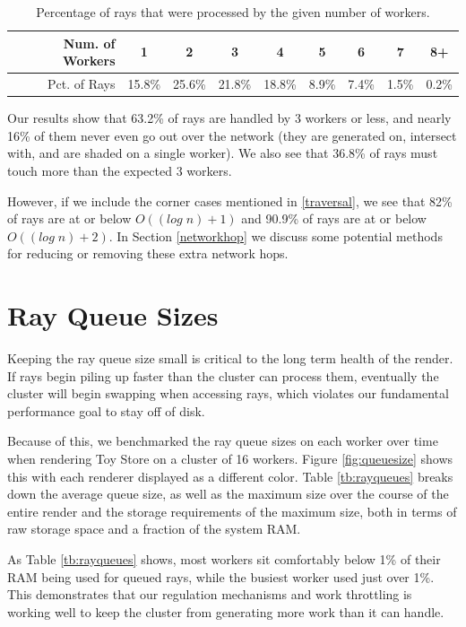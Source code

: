 \documentclass[12pt]{ucthesis}
\begin{document}
\begin{table}
\begin{center}
\begin{tabular}{|r||c|c|c|c|c|c|c|c|}
    \hline
    Num. of Workers& 1 & 2 & 3 & 4 & 5 & 6 & 7 & 8+ \\
    \hline
    Pct. of Rays & 15.8\% & 25.6\% & 21.8\% & 18.8\% & 8.9\% & 7.4\% & 1.5\% & 0.2\% \\
    \hline
\end{tabular}
\caption{Percentage of rays that were processed by the given number of workers.}
\label{tb:nethopspercent}
\end{center}
\end{table}

Our results show that 63.2\% of rays are handled by 3 workers or less, and
nearly 16\% of them never even go out over the network (they are generated on,
intersect with, and are shaded on a single worker). We also see that 36.8\% of
rays must touch more than the expected 3 workers.

However, if we include the corner cases mentioned in \ref{traversal}, we see that
82\% of rays are at or below $O((log\;n) + 1)$ and 90.9\% of rays are at or
below $O((log\;n) + 2)$. In Section \ref{networkhop} we discuss some potential
methods for reducing or removing these extra network hops.

\section{Ray Queue Sizes}
\label{queuesizes}

Keeping the ray queue size small is critical to the long term health of the
render. If rays begin piling up faster than the cluster can process them,
eventually the cluster will begin swapping when accessing rays, which violates
our fundamental performance goal to stay off of disk.

Because of this, we benchmarked the ray queue sizes on each worker over time
when rendering Toy Store on a cluster of 16 workers. Figure \ref{fig:queuesize}
shows this with each renderer displayed as a different color. Table \ref{tb:rayqueues}
breaks down the average queue size, as well as the maximum size over the course
of the entire render and the storage requirements of the maximum size, both in
terms of raw storage space and a fraction of the system RAM.

As Table \ref{tb:rayqueues} shows, most workers sit comfortably below 1\% of
their RAM being used for queued rays, while the busiest worker used just over
1\%. This demonstrates that our regulation mechanisms and work throttling is
working well to keep the cluster from generating more work than it can handle.
\end{document}
